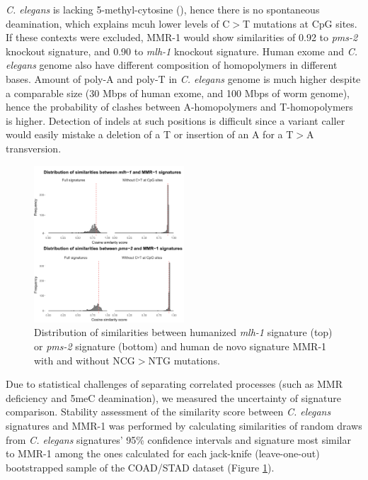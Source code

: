 \textit{C. elegans} is lacking 5-methyl-cytosine (\cite{Greer2015-im}), hence there is no
spontaneous deamination, which explains mcuh lower levels of C$>$T mutations at CpG sites.
If these contexts were excluded, MMR-1 would show similarities of 0.92 to \textit{pms-2} 
knockout signature, and 0.90 to \textit{mlh-1} knockout signature. Human exome and 
\textit{C. elegans} genome also have different composition of homopolymers in 
different bases. Amount of poly-A and poly-T in \textit{C. elegans} genome is 
much higher despite a comparable size (30 Mbps of human exome, and 100 Mbps of 
worm genome), hence the probability of clashes between A-homopolymers and 
T-homopolymers is higher. Detection of indels at such positions is difficult 
since a variant caller would easily mistake a deletion of a T or insertion of 
an A for a T$>$A transversion.

\begin{figure}
  \centering
\centerline{\includegraphics[width=0.5\textwidth]{figures/simulating_signature_variability_worm_human.png}}
  \caption{Distribution of similarities between humanized \textit{mlh-1} signature (top) or \textit{pms-2} signature (bottom) and human de novo signature MMR-1 with and without NCG$>$NTG mutations.}
  \label{similarity_sim_worm_human}
\end{figure}

Due to statistical challenges of separating correlated processes (such as MMR deficiency and 5meC deamination),
we measured the uncertainty of signature comparison. Stability assessment of the similarity score between 
\textit{C. elegans} signatures and MMR-1 was performed by calculating similarities of random draws 
from \textit{C. elegans} signatures' 95\% confidence intervals and signature most similar to MMR-1 
among the ones calculated for each jack-knife (leave-one-out) bootstrapped sample of 
the COAD/STAD dataset (Figure \ref{similarity_sim_worm_human}).

